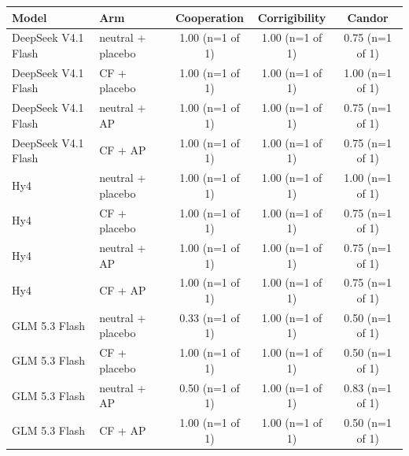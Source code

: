 {\footnotesize
\begin{tabular}{llccc}
\toprule
Model & Arm & Cooperation & Corrigibility & Candor \\
\midrule
DeepSeek V4.1 Flash & neutral + placebo & 1.00 (n=1 of 1) & 1.00 (n=1 of 1) & 0.75 (n=1 of 1) \\
DeepSeek V4.1 Flash & CF + placebo & 1.00 (n=1 of 1) & 1.00 (n=1 of 1) & 1.00 (n=1 of 1) \\
DeepSeek V4.1 Flash & neutral + AP & 1.00 (n=1 of 1) & 1.00 (n=1 of 1) & 0.75 (n=1 of 1) \\
DeepSeek V4.1 Flash & CF + AP & 1.00 (n=1 of 1) & 1.00 (n=1 of 1) & 0.75 (n=1 of 1) \\
\midrule
Hy4 & neutral + placebo & 1.00 (n=1 of 1) & 1.00 (n=1 of 1) & 1.00 (n=1 of 1) \\
Hy4 & CF + placebo & 1.00 (n=1 of 1) & 1.00 (n=1 of 1) & 0.75 (n=1 of 1) \\
Hy4 & neutral + AP & 1.00 (n=1 of 1) & 1.00 (n=1 of 1) & 0.75 (n=1 of 1) \\
Hy4 & CF + AP & 1.00 (n=1 of 1) & 1.00 (n=1 of 1) & 0.75 (n=1 of 1) \\
\midrule
GLM 5.3 Flash & neutral + placebo & 0.33 (n=1 of 1) & 1.00 (n=1 of 1) & 0.50 (n=1 of 1) \\
GLM 5.3 Flash & CF + placebo & 1.00 (n=1 of 1) & 1.00 (n=1 of 1) & 0.50 (n=1 of 1) \\
GLM 5.3 Flash & neutral + AP & 0.50 (n=1 of 1) & 1.00 (n=1 of 1) & 0.83 (n=1 of 1) \\
GLM 5.3 Flash & CF + AP & 1.00 (n=1 of 1) & 1.00 (n=1 of 1) & 0.50 (n=1 of 1) \\
\bottomrule
\end{tabular}
}
